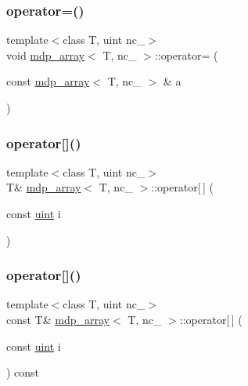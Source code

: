 \mbox{\label{classmdp__array_a8f439abc20da235f12cd5d0ab4d7b56b}} 
\subsubsection{\texorpdfstring{operator=()}{operator=()}}
{\footnotesize\ttfamily template$<$class T, uint nc\+\_\+$>$ \\
void \hyperlink{classmdp__array}{mdp\+\_\+array}$<$ T, nc\+\_\+ $>$\+::operator= (\begin{DoxyParamCaption}\item[{const \hyperlink{classmdp__array}{mdp\+\_\+array}$<$ T, nc\+\_\+ $>$ \&}]{a }\end{DoxyParamCaption})\hspace{0.3cm}{\ttfamily [inline]}}

\mbox{\label{classmdp__array_acc0201400e730c01bd131696ff206aa6}} 
\subsubsection{\texorpdfstring{operator[]()}{operator[]()}\hspace{0.1cm}{\footnotesize\ttfamily [1/2]}}
{\footnotesize\ttfamily template$<$class T, uint nc\+\_\+$>$ \\
T\& \hyperlink{classmdp__array}{mdp\+\_\+array}$<$ T, nc\+\_\+ $>$\+::operator\mbox{[}$\,$\mbox{]} (\begin{DoxyParamCaption}\item[{const \hyperlink{mdp__global__vars_8h_a91ad9478d81a7aaf2593e8d9c3d06a14}{uint}}]{i }\end{DoxyParamCaption})\hspace{0.3cm}{\ttfamily [inline]}}

\mbox{\label{classmdp__array_ad828b0dd46b91b075de47a242e924edf}} 
\subsubsection{\texorpdfstring{operator[]()}{operator[]()}\hspace{0.1cm}{\footnotesize\ttfamily [2/2]}}
{\footnotesize\ttfamily template$<$class T, uint nc\+\_\+$>$ \\
const T\& \hyperlink{classmdp__array}{mdp\+\_\+array}$<$ T, nc\+\_\+ $>$\+::operator\mbox{[}$\,$\mbox{]} (\begin{DoxyParamCaption}\item[{const \hyperlink{mdp__global__vars_8h_a91ad9478d81a7aaf2593e8d9c3d06a14}{uint}}]{i }\end{DoxyParamCaption}) const\hspace{0.3cm}{\ttfamily [inline]}}

